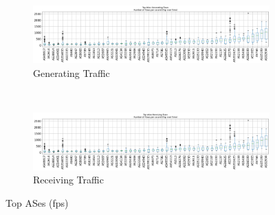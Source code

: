 \documentclass[10pt, journal, letterpaper]{IEEEtran}
\newcommand\boxFigSze{1}
\begin{document}
\begin{figure}
    \begin{subfigure}{\boxFigSze\textwidth}
          \centering
          \includegraphics[width=\columnwidth]{img/top_AS_generating_fps.png}
          \caption{Generating Traffic}
          \label{fig:top_generating_fps}
    \end{subfigure}\\
    \begin{subfigure}{\boxFigSze\textwidth}
          \centering
          \includegraphics[width=\columnwidth]{img/top_AS_receiving_fps.png}
          \caption{Receiving Traffic}
          \label{fig:top_receiving_fps}
    \end{subfigure}
    \caption{Top ASes (fps)}
    \label{fig:top_AS_fps}
\end{figure}
\end{document}
